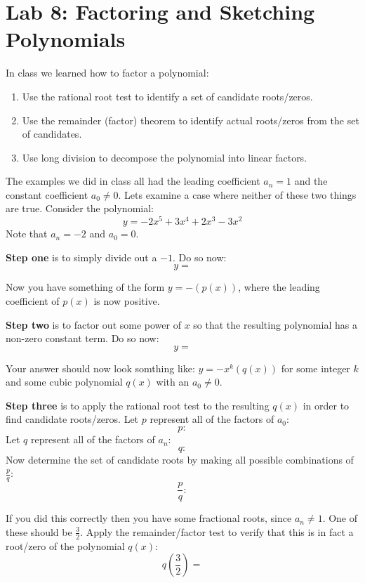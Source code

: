 \documentclass[letterpaper,12pt,fleqn]{article}
\begin{document}
\section*{Lab 8: Factoring and Sketching Polynomials}

In class we learned how to factor a polynomial:
\begin{enumerate}
\item Use the rational root test to identify a set of candidate roots/zeros.
\item Use the remainder (factor) theorem to identify actual roots/zeros from
  the set of candidates.
\item Use long division to decompose the polynomial into linear factors.
\end{enumerate}

The examples we did in class all had the leading coefficient $a_n=1$ and the
constant coefficient $a_0\ne0$. Lets examine a case where neither of these two
things are true. Consider the polynomial:
\[y=-2x^5+3x^4+2x^3-3x^2\]
Note that $a_n=-2$ and $a_0=0$.

\textbf{Step one} is to simply divide out a $-1$. Do so now:
\[y=\]

Now you have something of the form $y=-\left(p(x)\right)$, where the leading coefficient
of $p(x)$ is now positive.

\textbf{Step two} is to factor out some power of $x$ so that the resulting polynomial has
a non-zero constant term. Do so now:
\[y=\]

Your answer should now look somthing like: $y=-x^k\left(q(x)\right)$ for some integer
$k$ and some cubic polynomial $q(x)$ with an $a_0\ne0$.

\textbf{Step three} is to apply the rational root test to the resulting $q(x)$ in order
to find candidate roots/zeros.
Let $p$ represent all of the factors of $a_0$:
\[p:\]
Let $q$ represent all of the factors of $a_n$:
\[q:\]
Now determine the set of candidate roots by making all possible combinations of
$\frac{p}{q}$:
\[\frac{p}{q}:\]

\newpage

If you did this correctly then you have some fractional roots, since $a_n\ne1$. One of
these should be $\frac{3}{2}$. Apply the remainder/factor test to verify that this is in
fact a root/zero of the polynomial $q(x)$:
\[q\left(\frac{3}{2}\right)=\]

\vspace{1in}
\end{document}
